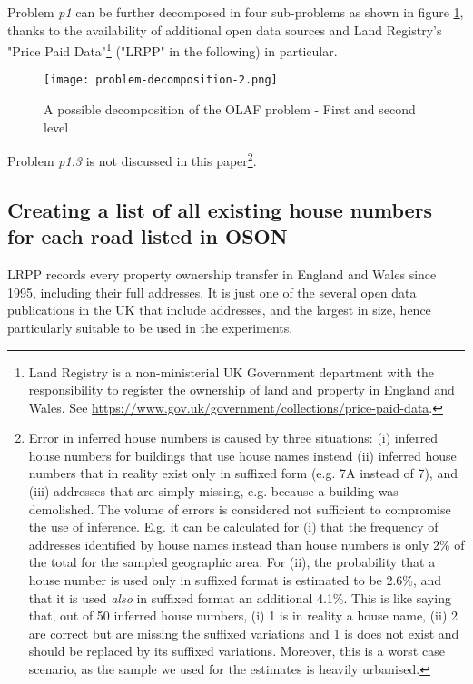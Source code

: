 Problem {\it p1} can be further decomposed in four sub-problems as shown in figure \ref{fig:problem_decomposition_2}, thanks to the availability of additional open data sources and Land Registry's "Price Paid Data"\footnote{Land Registry is a non-ministerial UK Government department with the responsibility to register the ownership of land and property in England and Wales. See \url{https://www.gov.uk/government/collections/price-paid-data}.} ("LRPP" in the following) in particular.
    
\begin{figure}
	\texttt{[image: problem-decomposition-2.png]}
	\caption{A possible decomposition of the OLAF problem - First and second level}
	\label{fig:problem_decomposition_2}
\end{figure}

Problem {\it p1.3} is not discussed in this paper\footnote{Error in inferred house numbers is caused by three situations: (i) inferred house numbers for buildings that use house names instead (ii) inferred house numbers that in reality exist only in suffixed form (e.g. 7A instead of 7), and (iii) addresses that are simply missing, e.g. because a building was demolished. The volume of errors is considered not sufficient to compromise the use of inference. E.g. it can be calculated for (i) that the frequency of addresses identified by house names instead than house numbers is only 2\% of the total for the sampled geographic area. For (ii), the probability that a house number is used only in suffixed format is estimated to be 2.6\%, and that it is used {\it also} in suffixed format an additional 4.1\%. This is like saying that, out of 50 inferred house numbers, (i) 1 is in reality a house name, (ii) 2 are correct but are missing the suffixed variations and 1 is does not exist and should be replaced by its suffixed variations. Moreover, this is a worst case scenario, as the sample we used for the estimates is heavily urbanised.}.

\subsection{Creating a list of all existing house numbers for each road listed in OSON} 

LRPP records every property ownership transfer in England and Wales since 1995, including their full addresses. It is just one of the several open data publications in the UK that include addresses, and the largest in size, hence particularly suitable to be used in the experiments.

